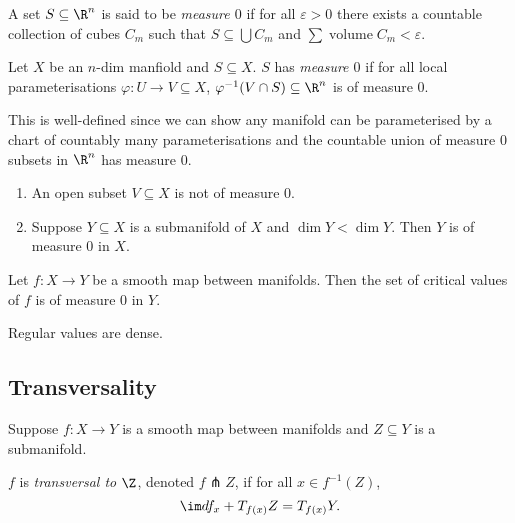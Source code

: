 \documentclass[a4paper]{article}
\begin{document}
\begin{definition}
  A set \(S \subseteq \R^n\) is said to be \emph{measure \(0\)} if for all \(\varepsilon > 0\) there exists a countable collection of cubes \(C_m\) such that \(S \subseteq \bigcup C_m\) and \(\sum \operatorname{volume} C_m < \varepsilon\).
\end{definition}

\begin{definition}
  Let \(X\) be an \(n\)-dim manfiold and \(S \subseteq X\). \(S\) has \emph{measure \(0\)} if for all local parameterisations \(\varphi: U \to V \subseteq X\), \(\varphi^{-1}(V \cap S) \subseteq \R^n\) is of measure \(0\).
\end{definition}

This is well-defined since we can show any manifold can be parameterised by a chart of countably many parameterisations and the countable union of measure \(0\) subsets in \(\R^n\) has measure \(0\).

\begin{remark}\leavevmode
  \begin{enumerate}
  \item An open subset \(V \subseteq X\) is not of measure \(0\).
  \item Suppose \(Y \subseteq X\) is a submanifold of \(X\) and \(\dim Y < \dim Y\). Then \(Y\) is of measure \(0\) in \(X.\)
  \end{enumerate}
\end{remark}

\begin{theorem}
  Let \(f: X \to Y\) be a smooth map between manifolds. Then the set of critical values of \(f\) is of measure \(0\) in \(Y\).
\end{theorem}

\begin{corollary}
  Regular values are dense.
\end{corollary}

\subsection{Transversality}

Suppose \(f: X \to Y\) is a smooth map between manifolds and \(Z \subseteq Y\) is a submanifold.

\begin{definition}[Transversality]
  \(f\) is \emph{transversal to \(\Z\)}, denoted \(f \pitchfork Z\), if for all \(x \in f^{-1}(Z)\),
  \[
    \im df_x + T_{f(x)}Z = T_{f(x)}Y.
  \]
\end{definition}
\end{document}
